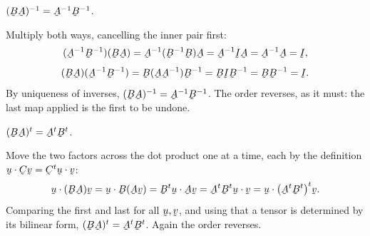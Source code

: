\begin{problem}
$(\bB\bA)^{-1}=\bA^{-1}\bB^{-1}$.
\end{problem}
\begin{solution}
Multiply both ways, cancelling the inner pair first:
\[
   (\bA^{-1}\bB^{-1})(\bB\bA)=\bA^{-1}(\bB^{-1}\bB)\bA=\bA^{-1}\I\bA
   =\bA^{-1}\bA=\I,
\]
\[
   (\bB\bA)(\bA^{-1}\bB^{-1})=\bB(\bA\bA^{-1})\bB^{-1}=\bB\I\bB^{-1}
   =\bB\bB^{-1}=\I .
\]
By uniqueness of inverses, $(\bB\bA)^{-1}=\bA^{-1}\bB^{-1}$. The order
reverses, as it must: the last map applied is the first to be undone.
\end{solution}

\begin{problem}
$(\bB\bA)^{t}=\bA^{t}\bB^{t}$.
\end{problem}
\begin{solution}
Move the two factors across the dot product one at a time, each by the
definition $\ip{\bu}{\bC\bv}=\ip{\bC^{t}\bu}{\bv}$:
\[
   \ip{\bu}{(\bB\bA)\bv}=\ip{\bu}{\bB(\bA\bv)}
   =\ip{\bB^{t}\bu}{\bA\bv}
   =\ip{\bA^{t}\bB^{t}\bu}{\bv}
   =\ip{\bu}{\big(\bA^{t}\bB^{t}\big)^{t}\bv}.
\]
Comparing the first and last for all $\bu,\bv$, and using that a tensor is
determined by its bilinear form, $(\bB\bA)^{t}=\bA^{t}\bB^{t}$. Again the
order reverses.
\end{solution}

